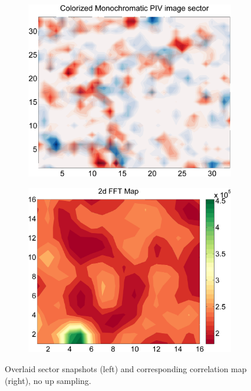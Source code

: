 \begin{figure}[H]
	\begin{subfigure}{.49\textwidth}
		\centering
		\includegraphics[width=.9\linewidth]{figs/piv_method/pive-fig_order0}
	\end{subfigure} 
	\begin{subfigure}{.49\textwidth}
		\centering
		\includegraphics[width=.9\linewidth]{figs/piv_method/pive_fft_order0}
	\end{subfigure}	
	\caption{Overlaid sector snapshots (left) and corresponding correlation 
		map (right), no up sampling.}
	\label{fig:piv_sector_overlay_fft_0up}
\end{figure}
\vspace{32pt}

